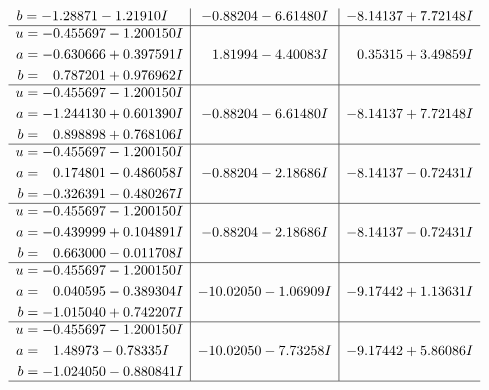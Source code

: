 \documentclass[1p]{elsarticle_modified}
\theoremstyle{definition}
\begin{document}
$$\begin{array}{c|c|c}
\begin{aligned}
b &= -1.28871 - 1.21910 I\end{aligned}
 & -0.88204 - 6.61480 I & -8.14137 + 7.72148 I \\ \hline\begin{aligned}
u &= -0.455697 - 1.200150 I \\
a &= -0.630666 + 0.397591 I \\
b &= \phantom{-}0.787201 + 0.976962 I\end{aligned}
 & \phantom{-}1.81994 - 4.40083 I & \phantom{-}0.35315 + 3.49859 I \\ \hline\begin{aligned}
u &= -0.455697 - 1.200150 I \\
a &= -1.244130 + 0.601390 I \\
b &= \phantom{-}0.898898 + 0.768106 I\end{aligned}
 & -0.88204 - 6.61480 I & -8.14137 + 7.72148 I \\ \hline\begin{aligned}
u &= -0.455697 - 1.200150 I \\
a &= \phantom{-}0.174801 - 0.486058 I \\
b &= -0.326391 - 0.480267 I\end{aligned}
 & -0.88204 - 2.18686 I & -8.14137 - 0.72431 I \\ \hline\begin{aligned}
u &= -0.455697 - 1.200150 I \\
a &= -0.439999 + 0.104891 I \\
b &= \phantom{-}0.663000 - 0.011708 I\end{aligned}
 & -0.88204 - 2.18686 I & -8.14137 - 0.72431 I \\ \hline\begin{aligned}
u &= -0.455697 - 1.200150 I \\
a &= \phantom{-}0.040595 - 0.389304 I \\
b &= -1.015040 + 0.742207 I\end{aligned}
 & -10.02050 - 1.06909 I & -9.17442 + 1.13631 I \\ \hline\begin{aligned}
u &= -0.455697 - 1.200150 I \\
a &= \phantom{-}1.48973 - 0.78335 I \\
b &= -1.024050 - 0.880841 I\end{aligned}
 & -10.02050 - 7.73258 I & -9.17442 + 5.86086 I\\
 \hline 
 \end{array}$$\newpage\newpage\renewcommand{\arraystretch}{1}
\end{document}
